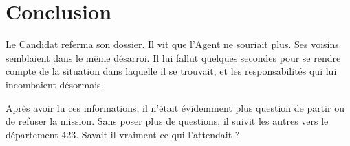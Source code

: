 \section{Conclusion}

Le Candidat referma son dossier. Il vit que l'Agent ne souriait plus. Ses
voisins semblaient dans le même désarroi. Il lui fallut quelques secondes pour
se rendre compte de la situation dans laquelle il se trouvait, et les
responsabilités qui lui incombaient désormais.

Après avoir lu ces informations, il n'était évidemment plus question de partir
ou de refuser la mission. Sans poser plus de questions, il suivit les autres
vers le département 423. Savait-il vraiment ce qui l'attendait ?
